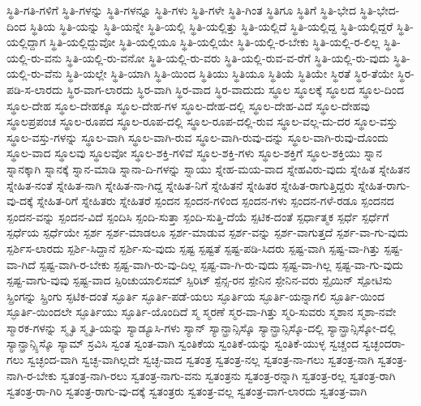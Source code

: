 {ಸ್ಥಿತಿ-ಗತಿ-ಗಳಿಗೆ
ಸ್ಥಿತಿ-ಗಳನ್ನು
ಸ್ಥಿತಿ-ಗಳನ್ನೂ
ಸ್ಥಿತಿ-ಗಳು
ಸ್ಥಿತಿ-ಗಳೇ
ಸ್ಥಿತಿ-ಗಿಂತ
ಸ್ಥಿತಿಗೂ
ಸ್ಥಿತಿಗೆ
ಸ್ಥಿತಿ-ಭೇದ
ಸ್ಥಿತಿ-ಭೇದ-ದಿಂದ
ಸ್ಥಿತಿಯ
ಸ್ಥಿತಿ-ಯನ್ನು
ಸ್ಥಿತಿ-ಯನ್ನೇ
ಸ್ಥಿತಿ-ಯಲ್ಲಿ
ಸ್ಥಿತಿ-ಯಲ್ಲಿತ್ತು
ಸ್ಥಿತಿ-ಯಲ್ಲಿದೆ
ಸ್ಥಿತಿ-ಯಲ್ಲಿದ್ದ
ಸ್ಥಿತಿ-ಯಲ್ಲಿದ್ದರೆ
ಸ್ಥಿತಿ-ಯಲ್ಲಿದ್ದಾಗ
ಸ್ಥಿತಿ-ಯಲ್ಲಿದ್ದುವೋ
ಸ್ಥಿತಿ-ಯಲ್ಲಿಯೂ
ಸ್ಥಿತಿ-ಯಲ್ಲಿಯೇ
ಸ್ಥಿತಿ-ಯಲ್ಲಿ-ರ-ಬೇಕು
ಸ್ಥಿತಿ-ಯಲ್ಲಿ-ರ-ಲಿಲ್ಲ
ಸ್ಥಿತಿ-ಯಲ್ಲಿ-ರು-ವನು
ಸ್ಥಿತಿ-ಯಲ್ಲಿ-ರು-ವನೋ
ಸ್ಥಿತಿ-ಯಲ್ಲಿ-ರು-ವರು
ಸ್ಥಿತಿ-ಯಲ್ಲಿ-ರುವ-ವ-ರೆಗೆ
ಸ್ಥಿತಿ-ಯಲ್ಲಿ-ರು-ವುದು
ಸ್ಥಿತಿ-ಯಲ್ಲಿ-ರು-ವೆನು
ಸ್ಥಿತಿ-ಯಲ್ಲೇ
ಸ್ಥಿತಿ-ಯಾಗಿ
ಸ್ಥಿತಿ-ಯಿಂದ
ಸ್ಥಿತಿಯು
ಸ್ಥಿತಿಯೂ
ಸ್ಥಿತಿಯೆ
ಸ್ಥಿತಿಯೇ
ಸ್ಥಿರತೆ
ಸ್ಥಿರ-ತೆಯೇ
ಸ್ಥಿರ-ಪಡಿ-ಸ-ಲಾರದು
ಸ್ಥಿರ-ವಾಗ-ಲಾರದು
ಸ್ಥಿರ-ವಾಗಿ
ಸ್ಥಿರ-ವಾದ
ಸ್ಥಿರ-ವಾದುದು
ಸ್ಥೂಲ
ಸ್ಥೂಲಕ್ಕೆ
ಸ್ಥೂಲದ
ಸ್ಥೂಲ-ದಿಂದ
ಸ್ಥೂಲ-ದೇಹ
ಸ್ಥೂಲ-ದೇಹಕ್ಕೂ
ಸ್ಥೂಲ-ದೇಹ-ಗಳ
ಸ್ಥೂಲ-ದೇಹ-ದಲ್ಲಿ
ಸ್ಥೂಲ-ದೇಹ-ವಿದೆ
ಸ್ಥೂಲ-ದೇಹವು
ಸ್ಥೂಲಪ್ರಪಂಚ
ಸ್ಥೂಲ-ರೂಪದ
ಸ್ಥೂಲ-ರೂಪ-ದಲ್ಲಿ
ಸ್ಥೂಲ-ರೂಪ-ದಲ್ಲಿ-ರುವ
ಸ್ಥೂಲ-ವಲ್ಲ-ದು-ದರ
ಸ್ಥೂಲ-ವಸ್ತು
ಸ್ಥೂಲ-ವಸ್ತು-ಗಳನ್ನು
ಸ್ಥೂಲ-ವಾಗಿ
ಸ್ಥೂಲ-ವಾಗಿ-ರುವ
ಸ್ಥೂಲ-ವಾಗಿ-ರುವು-ದನ್ನು
ಸ್ಥೂಲ-ವಾಗಿ-ರುವು-ದೊಂದು
ಸ್ಥೂಲ-ವಾದ
ಸ್ಥೂಲವು
ಸ್ಥೂಲವೋ
ಸ್ಥೂಲ-ಶಕ್ತಿ-ಗಳಿವೆ
ಸ್ಥೂಲ-ಶಕ್ತಿ-ಗಳು
ಸ್ಥೂಲ-ಶಕ್ತಿಗೆ
ಸ್ಥೂಲ-ಶಕ್ತಿಯು
ಸ್ನಾನ
ಸ್ನಾನಕ್ಕಾಗಿ
ಸ್ನಾನಕ್ಕೆ
ಸ್ನಾನ-ಮಾಡಿ
ಸ್ನಾನಾ-ದಿ-ಗಳನ್ನು
ಸ್ನಾಯು
ಸ್ನೇಹ-ಮಯ-ವಾದ
ಸ್ನೇಹವಿರು-ವುದು
ಸ್ನೇಹಿತ
ಸ್ನೇಹಿತನ
ಸ್ನೇಹಿತ-ನಂತೆ
ಸ್ನೇಹಿತ-ನಾಗಿ
ಸ್ನೇಹಿತ-ನಾ-ಗಿದ್ದ
ಸ್ನೇಹಿತ-ನಿಗೆ
ಸ್ನೇಹಿತನೆ
ಸ್ನೇಹಿತರ
ಸ್ನೇಹಿತ-ರಾಗುತ್ತಿದ್ದರು
ಸ್ನೇಹಿತ-ರಾಗು-ವು-ದಕ್ಕೆ
ಸ್ನೇಹಿತ-ರಿಗೆ
ಸ್ನೇಹಿತರು
ಸ್ನೇಹಿತರೆ
ಸ್ಪಂದನ
ಸ್ಪಂದನ-ಗಳಿಂದ
ಸ್ಪಂದನ-ಗಳು
ಸ್ಪಂದನ-ಗಳೆ-ರಡೂ
ಸ್ಪಂದನದ
ಸ್ಪಂದನ-ವನ್ನು
ಸ್ಪಂದನ-ವಿದೆ
ಸ್ಪಂದಿಸಿ
ಸ್ಪಂದಿ-ಸುತ್ತಾ
ಸ್ಪಂದಿ-ಸುತ್ತಿ-ದೆಯೆ
ಸ್ಪಟಿಕ-ದಂತೆ
ಸ್ಪರ್ಧಾತ್ಮಕ
ಸ್ಪರ್ಧೆ
ಸ್ಪರ್ಧೆಗೆ
ಸ್ಪರ್ಧೆಯ
ಸ್ಪರ್ಧೆಯೇ
ಸ್ಪರ್ಶ
ಸ್ಪರ್ಶ-ಮಾಡಲೂ
ಸ್ಪರ್ಶ-ಮಾಡುವ
ಸ್ಪರ್ಶ-ವನ್ನು
ಸ್ಪರ್ಶ-ವಾಗುತ್ತದೆ
ಸ್ಪರ್ಶ-ವಾ-ಗು-ವುದು
ಸ್ಪರ್ಶಿಸ-ಲಾರದು
ಸ್ಪರ್ಶಿ-ಸಿದ್ದಾನೆ
ಸ್ಪರ್ಶಿ-ಸು-ವುದು
ಸ್ಪಷ್ಟ
ಸ್ಪಷ್ಟತೆ
ಸ್ಪಷ್ಟ-ಪಡಿ-ಸಿದರು
ಸ್ಪಷ್ಟ-ವಾಗಿ
ಸ್ಪಷ್ಟ-ವಾ-ಗಿತ್ತು
ಸ್ಪಷ್ಟ-ವಾ-ಗಿದೆ
ಸ್ಪಷ್ಟ-ವಾಗಿ-ರ-ಬೇಕು
ಸ್ಪಷ್ಟ-ವಾಗಿ-ರು-ವು-ದಿಲ್ಲ
ಸ್ಪಷ್ಟ-ವಾ-ಗಿ-ರು-ವುದು
ಸ್ಪಷ್ಟ-ವಾ-ಗಿಲ್ಲ
ಸ್ಪಷ್ಟ-ವಾ-ಗು-ವುದು
ಸ್ಪಷ್ಟ-ವಾಗು-ವುವು
ಸ್ಪಷ್ಟ-ವಾದ
ಸ್ಪಿರಿಚುಯಾಲಿಸಮ್
ಸ್ಪಿರಿಟ್
ಸ್ಪೆನ್ಸ-ರನ
ಸ್ಪೇನಿನ
ಸ್ಪೇನಿನ-ವರು
ಸ್ಪೈಯಿನ್
ಸ್ಪೋಟಿಸು
ಸ್ಪ್ರಿಂಗನ್ನು
ಸ್ಪ್ರಿಂಗು
ಸ್ಫಟಿಕ-ದಂತೆ
ಸ್ಫೂರ್ತಿ
ಸ್ಫೂರ್ತಿ-ಪಡೆ-ಯಲು
ಸ್ಫೂರ್ತಿಯ
ಸ್ಫೂರ್ತಿ-ಯನ್ನಾಗಲಿ
ಸ್ಫೂರ್ತಿ-ಯಿಂದ
ಸ್ಫೂರ್ತಿ-ಯಿಂದಲೇ
ಸ್ಫೂರ್ತಿಯು
ಸ್ಫೂರ್ತಿ-ಯೊಂದಿದೆ
ಸ್ಮ
ಸ್ಮರಣೆ
ಸ್ಮರ-ವಾ-ಗಿತ್ತು
ಸ್ಮರಿ-ಸುವರು
ಸ್ಮಶಾನ
ಸ್ಮಶಾ-ನವೇ
ಸ್ಮಾರಕ-ಗಳನ್ನು
ಸ್ಮೃತಿ
ಸ್ಮೃತಿ-ಯನ್ನು
ಸ್ಯಾಡ್ಯೂಸಿ-ಗಳು
ಸ್ಯಾನ್
ಸ್ಯಾನ್ಫ್ರಾನ್ಸಿಸ್ಕೊ
ಸ್ಯಾನ್ಫ್ರಾನ್ಸಿಸ್ಕೊ-ದಲ್ಲಿ
ಸ್ಯಾನ್ಫ್ರಾನ್ಸಿಸ್ಕೋ-ದಲ್ಲಿ
ಸ್ಯಾನ್ಫ್ರಾನ್ಸ್ಸಿಸ್ಕೊ
ಸ್ಯಾಮ್
ಸ್ರವಿಸಿ
ಸ್ವಂತ
ಸ್ವಂತ-ವಾಗಿ
ಸ್ವಂತಿಕೆಯ
ಸ್ವಂತಿಕೆ-ಯನ್ನು
ಸ್ವಂತಿಕೆ-ಯುಳ್ಳ
ಸ್ವಚ್ಚಂದ
ಸ್ವಚ್ಛಂದರಾ-ಗಲು
ಸ್ವಚ್ಛಂದ-ವಾಗಿ
ಸ್ವಚ್ಛ-ವಾಗಿಲ್ಲದೇ
ಸ್ವಚ್ಛ-ವಾದ
ಸ್ವತಂತ್ರ
ಸ್ವತಂತ್ರ-ನಲ್ಲ
ಸ್ವತಂತ್ರ-ನಾ-ಗಲು
ಸ್ವತಂತ್ರ-ನಾಗಿ
ಸ್ವತಂತ್ರ-ನಾಗಿ-ರ-ಬೇಕು
ಸ್ವತಂತ್ರ-ನಾಗಿ-ರಲು
ಸ್ವತಂತ್ರ-ನಾಗು-ವನು
ಸ್ವತಂತ್ರನು
ಸ್ವತಂತ್ರ-ರನ್ನಾಗಿ
ಸ್ವತಂತ್ರ-ರಲ್ಲ
ಸ್ವತಂತ್ರ-ರಾಗಿ
ಸ್ವತಂತ್ರ-ರಾ-ಗಿರಿ
ಸ್ವತಂತ್ರ-ರಾಗು-ವು-ದಕ್ಕೆ
ಸ್ವತಂತ್ರರು
ಸ್ವತಂತ್ರ-ವಲ್ಲ
ಸ್ವತಂತ್ರ-ವಾಗ-ಲಾರದು
ಸ್ವತಂತ್ರ-ವಾಗಿ
}
